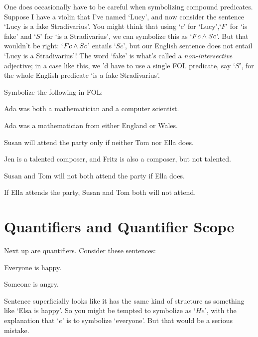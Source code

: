One does occasionally  have to be careful when symbolizing compound predicates.  Suppose I have a violin that I've named `Lucy', and now consider the sentence `Lucy is a fake Stradivarius'.  You might think that using `$c$' for `Lucy',`$F$' for `\blank is fake' and `$S$' for `\blank is a Stradivarius', we can symbolize this as `$Fc \wedge Sc$'.  But that wouldn't be right: `$Fc \wedge Sc$' entails `$Sc$', but our English sentence does not entail `Lucy is a Stradivarius'!  The word `fake' is what's called a \emph{non-intersective} adjective; in a case like this, we 'd have to use a single FOL predicate, say `$S$', for the  whole English predicate `\blank is a fake Stradivarius'.


\practiceproblems

\problempart Symbolize the following in FOL:



\begin{earg}
\item Ada was both a mathematician and a computer scientist.
\item Ada was a mathematician from either England or Wales.
\item Susan will attend the party only if neither Tom nor Ella does.
\item Jen is a talented composer, and Fritz is also a composer, but not talented.
\item Susan and Tom will not both attend the party if Ella does. 
\item If Ella attends the party, Susan and Tom both will not attend. 

\end{earg}


\section{Quantifiers and Quantifier Scope}\label{s:Quantifiers}
Next up are quantifiers. Consider these sentences:
	\begin{earg}
		\item[\ex{q.a}] Everyone is happy.
		\item[\ex{q.e}] Someone is angry.
	\end{earg}
Sentence  superficially looks like it has the same kind of structure as something like `Elsa is happy'.  So you might be tempted to symbolize  as `$He$', with the explanation that `$e$' is to symbolize `everyone'.  But that would be a serious mistake.

